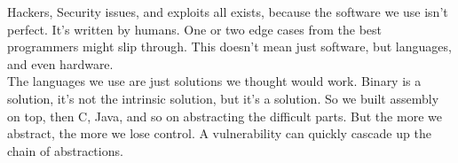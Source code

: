 
Hackers, Security issues, and exploits all exists, because the software
we use isn't perfect. It's written by humans. One or two edge cases from the best
programmers might slip through. This doesn't mean just software,
but languages, and even hardware.\\

\noindent
The languages we use are just solutions we thought would work. Binary is a solution, it's not the intrinsic solution,
but it's a solution. So we built assembly on top, then C, Java, and so on abstracting the
difficult parts. But the more we abstract, the more we lose control. A vulnerability
can quickly cascade up the chain of abstractions.\\